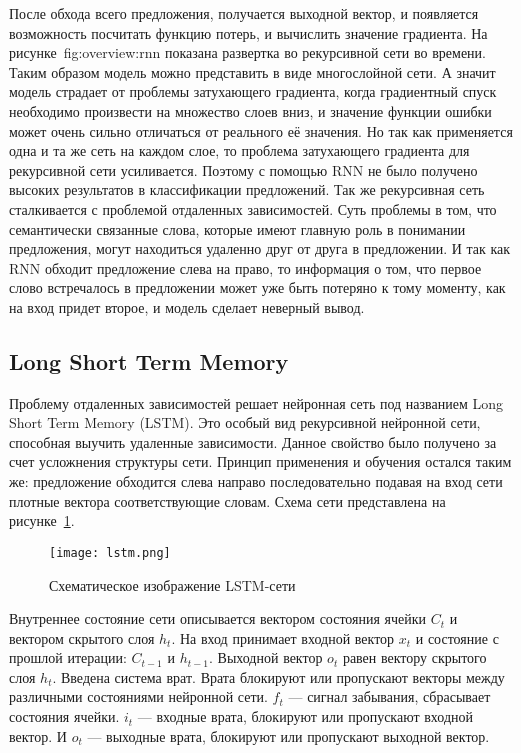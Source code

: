 После обхода всего предложения, получается выходной вектор, и появляется возможность посчитать функцию потерь, и вычислить значение градиента. На рисунке~{fig:overview:rnn} показана развертка во рекурсивной сети во времени. Таким образом модель можно представить в виде многослойной сети. А значит модель страдает от проблемы затухающего градиента, когда градиентный спуск необходимо произвести на множество слоев вниз, и значение функции ошибки может очень сильно отличаться от реального её значения. Но так как применяется одна и та же сеть на каждом слое, то проблема затухающего градиента для рекурсивной сети усиливается. Поэтому с помощью RNN не было получено высоких результатов в классификации предложений. Так же рекурсивная сеть сталкивается с проблемой отдаленных зависимостей. Суть проблемы в том, что семантически связанные слова, которые имеют главную роль в понимании предложения, могут находиться удаленно друг от друга в предложении. И так как RNN обходит предложение слева на право, то информация о том, что первое слово встречалось в предложении может уже быть потеряно к тому моменту, как на вход придет второе, и модель сделает неверный вывод.

\subsection{Long Short Term Memory}\label{sec:overview:lstm}
Проблему отдаленных зависимостей решает нейронная сеть под названием Long Short Term Memory (LSTM). Это особый вид рекурсивной нейронной сети, способная выучить удаленные зависимости. Данное свойство было получено за счет усложнения структуры сети. Принцип применения и обучения остался таким же: предложение обходится слева направо последовательно подавая на вход сети плотные вектора соответствующие словам. Схема сети представлена на рисунке~\ref{fig:overview:lstm}\cite{LSTM}.

\begin{figure}[h]
  \begin{center}
    \texttt{[image: lstm.png]}
    \caption{Схематическое изображение LSTM-сети}\label{fig:overview:lstm}
  \end{center}
\end{figure}

Внутреннее состояние сети описывается вектором состояния ячейки $C_t$ и вектором скрытого слоя $h_t$. На вход принимает входной вектор $x_t$ и состояние с прошлой итерации: $C_{t-1}$ и $h_{t-1}$. Выходной вектор $o_t$ равен вектору скрытого слоя $h_t$. Введена система врат. Врата блокируют или пропускают векторы между различными состояниями нейронной сети. $f_{t}$ --- сигнал забывания, сбрасывает состояния ячейки. $i_{t}$ --- входные врата, блокируют или пропускают входной вектор. И $o_t$ --- выходные врата, блокируют или пропускают выходной вектор\cite{LSTM}.

